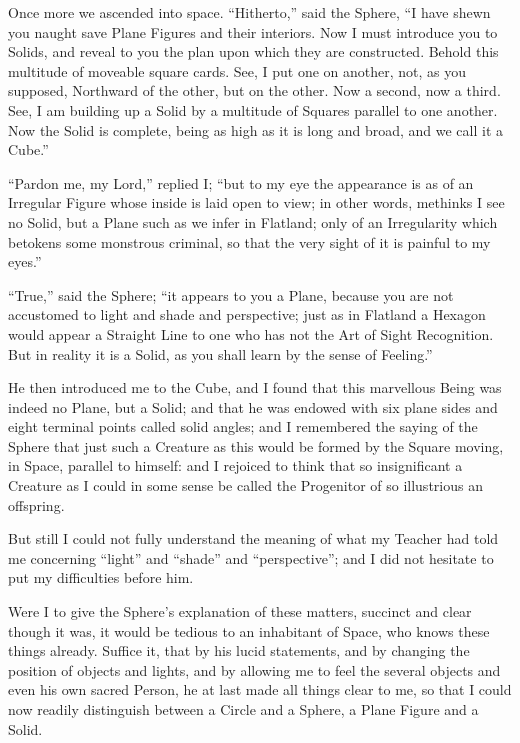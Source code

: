 \documentclass[12pt, a4paper, twoside]{memoir}
\begin{document}
Once more we ascended into space. ``Hitherto,'' said the Sphere, ``I have shewn
you naught save Plane Figures and their interiors. Now I must introduce you to
Solids, and reveal to you the plan upon which they are constructed. Behold
this multitude of moveable square cards. See, I put one on another, not, as
you supposed, Northward of the other, but on the other. Now a second, now a
third. See, I am building up a Solid by a multitude of Squares parallel to one
another. Now the Solid is complete, being as high as it is long and broad, and
we call it a Cube.''

``Pardon me, my Lord,'' replied I; ``but to my eye the appearance is as of an
Irregular Figure whose inside is laid open to view; in other words, methinks I
see no Solid, but a Plane such as we infer in Flatland; only of an
Irregularity which betokens some monstrous criminal, so that the very sight of
it is painful to my eyes.''

``True,'' said the Sphere; ``it appears to you a Plane, because you are not
accustomed to light and shade and perspective; just as in Flatland a Hexagon
would appear a Straight Line to one who has not the Art of Sight Recognition.
But in reality it is a Solid, as you shall learn by the sense of Feeling.''

He then introduced me to the Cube, and I found that this marvellous Being was
indeed no Plane, but a Solid; and that he was endowed with six plane sides and
eight terminal points called solid angles; and I remembered the saying of the
Sphere that just such a Creature as this would be formed by the Square moving,
in Space, parallel to himself: and I rejoiced to think that so insignificant a
Creature as I could in some sense be called the Progenitor of so illustrious
an offspring.

But still I could not fully understand the meaning of what my Teacher had told
me concerning ``light'' and ``shade'' and ``perspective''; and I did not hesitate to
put my difficulties before him.

Were I to give the Sphere's explanation of these matters, succinct and clear
though it was, it would be tedious to an inhabitant of Space, who knows these
things already. Suffice it, that by his lucid statements, and by changing the
position of objects and lights, and by allowing me to feel the several objects
and even his own sacred Person, he at last made all things clear to me, so
that I could now readily distinguish between a Circle and a Sphere, a Plane
Figure and a Solid.
\end{document}
